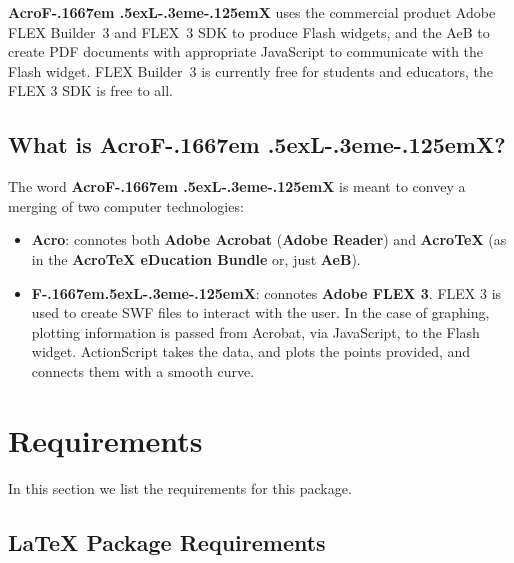 \documentclass{article}
\makeatletter
\def\AcroFLeX{AcroF\kern-.1667em
    \lower.5ex\hbox{L}\kern-.3eme\kern-.125emX\@}
\makeatother
\begin{document}
\textbf{{\AcroFLeX}} uses the commercial product Adobe FLEX
Builder~3 and FLEX~3 SDK to produce Flash widgets, and the AeB to
create PDF documents with appropriate JavaScript to communicate with
the Flash widget. FLEX Builder~3 is currently free for students and
educators, the FLEX 3 SDK is free to all.

%

\subsection{What is \texorpdfstring{{\AcroFLeX}}{AcroFLeX}?}

The word \textbf{\AcroFLeX} is meant to convey a merging of two computer technologies:
\begin{itemize}
\item \textbf{Acro}: connotes both \textbf{Adobe Acrobat} (\textbf{Adobe Reader})
and \textbf{{Acro\negthinspace\TeX}} (as in the
\textbf{{Acro\negthinspace\TeX} eDucation Bundle} or, just \textbf{AeB}).
\item \textbf{F\kern-.1667em\lower.5ex\hbox{L}\kern-.3eme\kern-.125emX\@}: connotes
   \textbf{Adobe FLEX 3}. FLEX 3 is used to create SWF files to interact with the user.
   In the case of graphing, plotting information is passed from Acrobat, via JavaScript,
   to the Flash widget. ActionScript takes the data, and plots the points provided, and
   connects them with a smooth curve.
\end{itemize}


\section{Requirements}

In this section we list the requirements for this package.

\subsection{{\LaTeX} Package Requirements}
\end{document}
